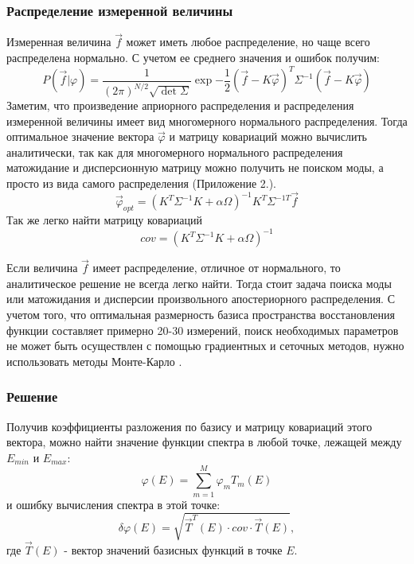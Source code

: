 \documentclass{config}
\begin{document}
\subsubsection{Распределение измеренной величины}
Измеренная величина $\vec{f}$ может иметь любое распределение, но чаще всего распределена нормально. С учетом ее среднего значения и ошибок получим:
\begin{equation}
    P(\vec{f} | \varphi) = \frac{1}{(2\pi)^{N/2} \sqrt{\det{\Sigma}}}\exp{-\frac{1}{2}(\vec{f} - K \vec{\varphi})^T \Sigma^{-1} (\vec{f} - K \vec{\varphi})}
\end{equation}
Заметим, что произведение априорного распределения и распределения измеренной величины имеет вид многомерного нормального распределения. Тогда оптимальное значение вектора $\vec{\varphi}$ и матрицу ковариаций можно вычислить аналитически, так как для многомерного нормального распределения матожидание и дисперсионную матрицу можно получить не поиском моды, а просто из вида самого распределения (Приложение 2.).
\begin{equation}
    \vec{\varphi}_{opt} = (K^T \Sigma^{-1}K + \alpha \Omega)^{-1} K^T \Sigma^{-1T} \vec{f}
\end{equation}
Так же легко найти матрицу ковариаций
\begin{equation}
    cov = (K^T \Sigma^{-1} K + \alpha \Omega)^{-1}
\end{equation}

Если величина $\vec{f}$ имеет распределение, отличное от нормального, то аналитическое решение не всегда легко найти. Тогда стоит задача поиска моды или матожидания и дисперсии произвольного апостериорного распределения. С учетом того, что оптимальная размерность базиса пространства восстановления функции составляет примерно 20-30 измерений, поиск необходимых параметров не может быть осуществлен с помощью градиентных и сеточных методов, нужно использовать методы Монте-Карло \cite{montecarlo_simple}.

\subsubsection{Решение}
Получив коэффициенты разложения по базису и матрицу ковариаций этого вектора, можно найти значение функции спектра в любой точке, лежащей между $E_{min}$ и $E_{max}$:
\begin{equation}
    \varphi(E) = \sum_{m=1}^M \varphi_m T_m(E)
\end{equation}
и ошибку вычисления спектра в этой точке:
\begin{equation}
    \delta \varphi(E) = \sqrt{\vec{T}^T(E) \cdot cov \cdot \vec{T}(E)},
\end{equation}
где $\vec{T}(E)$ - вектор значений базисных функций в точке $E$.
\end{document}
